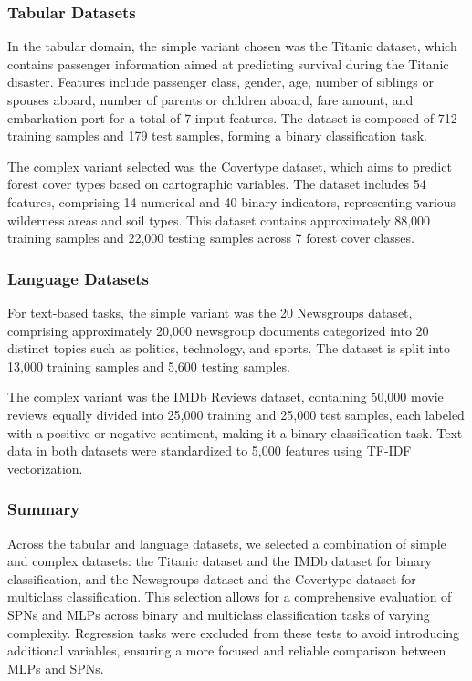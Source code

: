 \subsubsection{Tabular Datasets}
In the tabular domain, the simple variant chosen was the Titanic dataset, which contains passenger information aimed at predicting survival during the Titanic disaster. Features include passenger class, gender, age, number of siblings or spouses aboard, number of parents or children aboard, fare amount, and embarkation port for a total of 7 input features. The dataset is composed of 712 training samples and 179 test samples, forming a binary classification task.

The complex variant selected was the Covertype dataset, which aims to predict forest cover types based on cartographic variables. The dataset includes 54 features, comprising 14 numerical and 40 binary indicators, representing various wilderness areas and soil types. This dataset contains approximately 88,000 training samples and 22,000 testing samples across 7 forest cover classes.

\subsubsection{Language Datasets}
For text-based tasks, the simple variant was the 20 Newsgroups dataset, comprising approximately 20,000 newsgroup documents categorized into 20 distinct topics such as politics, technology, and sports. The dataset is split into 13,000 training samples and 5,600 testing samples. 

The complex variant was the IMDb Reviews dataset, containing 50,000 movie reviews equally divided into 25,000 training and 25,000 test samples, each labeled with a positive or negative sentiment, making it a binary classification task. Text data in both datasets were standardized to 5,000 features using TF-IDF vectorization.

\subsubsection{Summary}

Across the tabular and language datasets, we selected a combination of simple and complex datasets: the Titanic dataset and the IMDb dataset for binary classification, and the Newsgroups dataset and the Covertype dataset for multiclass classification. This selection allows for a comprehensive evaluation of SPNs and MLPs across binary and multiclass classification tasks of varying complexity. Regression tasks were excluded from these tests to avoid introducing additional variables, ensuring a more focused and reliable comparison between MLPs and SPNs.

